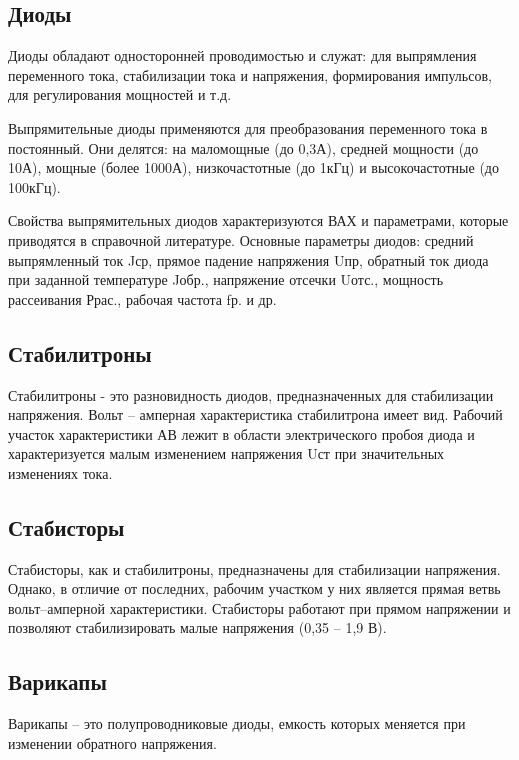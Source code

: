\documentclass[unicode, 12pt, a4paper, oneside]{article}
\begin{document}
\subsection*{Диоды}

Диоды обладают односторонней проводимостью и служат: для выпрямления переменного тока, стабилизации тока и напряжения, формирования импульсов, для регулирования мощностей и т.д.

Выпрямительные диоды применяются для преобразования переменного тока в постоянный. Они делятся: на маломощные (до 0,3А), средней мощности (до 10А), мощные (более 1000А), низкочастотные (до 1кГц) и высокочастотные (до 100кГц).

Свойства выпрямительных диодов характеризуются ВАХ и параметрами, которые приводятся в справочной литературе. Основные параметры диодов: средний выпрямленный ток Jср, прямое падение напряжения Uпр, обратный ток диода при заданной температуре Jобр., напряжение отсечки Uотс., мощность рассеивания Ррас., рабочая частота fр. и др.

\subsection*{Стабилитроны}

Стабилитроны - это разновидность диодов, предназначенных для стабилизации напряжения. Вольт – амперная характеристика стабилитрона имеет вид. Рабочий участок характеристики АВ лежит в области электрического пробоя диода и характеризуется малым изменением напряжения Uст при значительных изменениях тока.

\subsection*{Стабисторы}

Стабисторы, как и стабилитроны, предназначены для стабилизации напряжения. Однако, в отличие от последних, рабочим участком у них является прямая ветвь вольт–амперной характеристики. Стабисторы работают при прямом напряжении и позволяют стабилизировать малые напряжения (0,35 -- 1,9 В).

\subsection*{Варикапы}

Варикапы – это полупроводниковые диоды, емкость которых меняется при изменении обратного напряжения.


\end{document}
